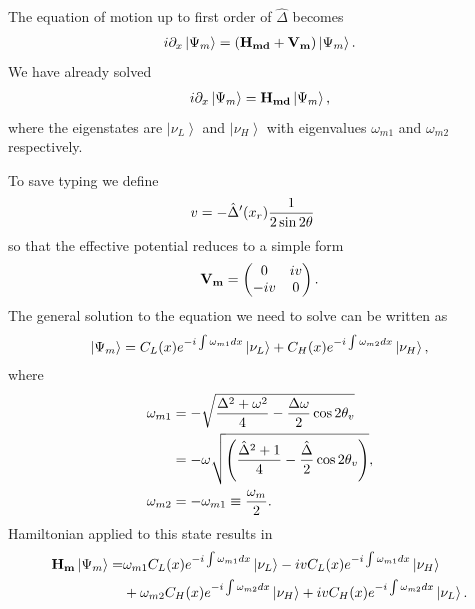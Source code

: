 \documentclass[letterpaper,12pt,english]{sphinxmanual}
\newcommand{\ket}[1]{\left| #1\right\rangle}
\begin{document}
The equation of motion up to first order of \(\hat\Delta\) becomes
\begin{gather}
\begin{split}i\partial_x\ket{\Psi_m} = (\mathbf{H_{md}} + \mathbf{V_m})\ket{\Psi_m}.\end{split}\notag
\end{gather}
We have already solved
\begin{gather}
\begin{split}i\partial_x\ket{\Psi_m} = \mathbf{H_{md}} \ket{\Psi_m},\end{split}\notag
\end{gather}
where the eigenstates are \(\ket{\nu_L}\) and \(\ket{\nu_H}\) with eigenvalues \(\omega_{m1}\) and \(\omega_{m2}\) respectively.

To save typing we define
\begin{gather}
\begin{split}v &= -  \hat\Delta'(x_r) \frac{1}{2\sin 2\theta}\end{split}\notag
\end{gather}
so that the effective potential reduces to a simple form
\begin{gather}
\begin{split}\mathbf{V_m} = \begin{pmatrix}
0 & i v \\
-i v & 0
\end{pmatrix}.\end{split}\notag
\end{gather}
The general solution to the equation we need to solve can be written as
\begin{gather}
\begin{split}\ket{\Psi_m} = C_L(x) e^{-i\int \omega_{m1} dx} \ket{\nu_L} + C_H(x) e^{-i\int \omega_{m2} dx} \ket{\nu_H},\end{split}\notag
\end{gather}
where
\begin{gather}
\begin{split}\omega_{m1} &=-\sqrt{ \frac{\Delta^2 + \omega^2}{4}-\frac{\Delta \omega}{2} \cos 2\theta_v } \\
& = -\omega \sqrt{\left( \frac{\hat\Delta^2 + 1}{4} - \frac{\hat\Delta}{2}\cos 2\theta_v \right)} , \\
\omega_{m2} & = - \omega_{m1} \equiv \frac{\omega_m}{2}.\end{split}\notag
\end{gather}
Hamiltonian applied to this state results in
\begin{gather}
\begin{split}\mathbf{H_m} \ket{\Psi_m} =& \omega_{m1} C_L(x) e^{-i\int \omega_{m1}dx} \ket{\nu_L} -ivC_L(x) e^{-i\int \omega_{m1}dx}\ket{\nu_H} \\ &+\omega_{m2}C_H(x) e^{-i\int \omega_{m2}dx}\ket{\nu_H} + iv C_H(x) e^{-i\int \omega_{m2}dx}\ket{\nu_L}.\end{split}\notag
\end{gather}
\end{document}
